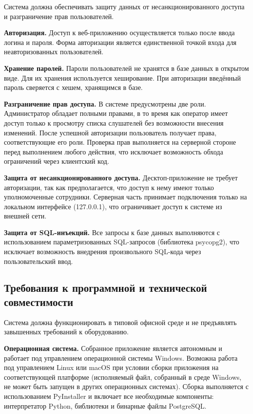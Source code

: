 Система должна обеспечивать защиту данных от несанкционированного доступа и разграничение прав пользователей.

\textbf{Авторизация.} Доступ к веб-приложению осуществляется только после ввода логина и пароля. Форма авторизации является единственной точкой входа для неавторизованных пользователей.

\textbf{Хранение паролей.} Пароли пользователей не хранятся в базе данных в открытом виде. Для их хранения используется хеширование. При авторизации введённый пароль сверяется с хешем, хранящимся в базе.

\textbf{Разграничение прав доступа.} В системе предусмотрены две роли. Администратор обладает полными правами, в то время как оператор имеет доступ только к просмотру списка слушателей без возможности внесения изменений. После успешной авторизации пользователь получает права, соответствующие его роли. Проверка прав выполняется на серверной стороне перед выполнением любого действия, что исключает возможность обхода ограничений через клиентский код.

\textbf{Защита от несанкционированного доступа.} Десктоп-приложение не требует авторизации, так как предполагается, что доступ к нему имеют только уполномоченные сотрудники. Серверная часть принимает подключения только на локальном интерфейсе (127.0.0.1), что ограничивает доступ к системе из внешней сети.

\textbf{Защита от SQL-инъекций.} Все запросы к базе данных выполняются с использованием параметризованных SQL-запросов (библиотека psycopg2), что исключает возможность внедрения произвольного SQL-кода через пользовательский ввод.

\subsection{Требования к программной и технической совместимости}

Система должна функционировать в типовой офисной среде и не предъявлять завышенных требований к оборудованию.

\textbf{Операционная система.} Собранное приложение является автономным и работает под управлением операционной системы Windows. Возможна работа под управлением Linux или macOS при условии сборки приложения на соответствующей платформе (исполняемый файл, собранный в среде Windows, не может быть запущен в других операционных системах). Сборка выполняется с использованием PyInstaller и включает все необходимые компоненты: интерпретатор Python, библиотеки и бинарные файлы PostgreSQL.

